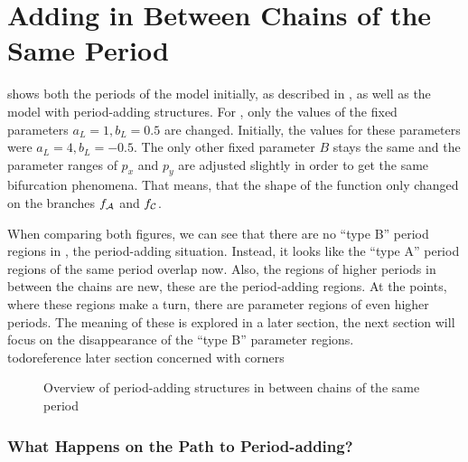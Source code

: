\section{Adding in Between Chains of the Same Period}

 shows both the periods of the model initially, as described in , as well as the model with period-adding structures.
For , only the values of the fixed parameters $a_L = 1, b_L = 0.5$ are changed.
Initially, the values for these parameters were $a_L = 4, b_L = -0.5$.
The only other fixed parameter $B$ stays the same and the parameter ranges of $p_x$ and $p_y$ are adjusted slightly in order to get the same bifurcation phenomena.
That means, that the shape of the function only changed on the branches $f_{\mathcal{A}}$ and $f_{\mathcal{C}}$.

When comparing both figures, we can see that there are no ``type B'' period regions in , the period-adding situation.
Instead, it looks like the ``type A'' period regions of the same period overlap now.
Also, the regions of higher periods in between the chains are new, these are the period-adding regions.
At the points, where these regions make a turn, there are parameter regions of even higher periods.
The meaning of these is explored in a later section, the next section will focus on the disappearance of the ``type B'' parameter regions.
\\todo{reference later section concerned with corners}

\begin{figure}
    \centering
    \caption{Overview of period-adding structures in between chains of the same period}
    \label{fig:minrep.adding1.overview}
\end{figure}

\subsubsection{What Happens on the Path to Period-adding?}

